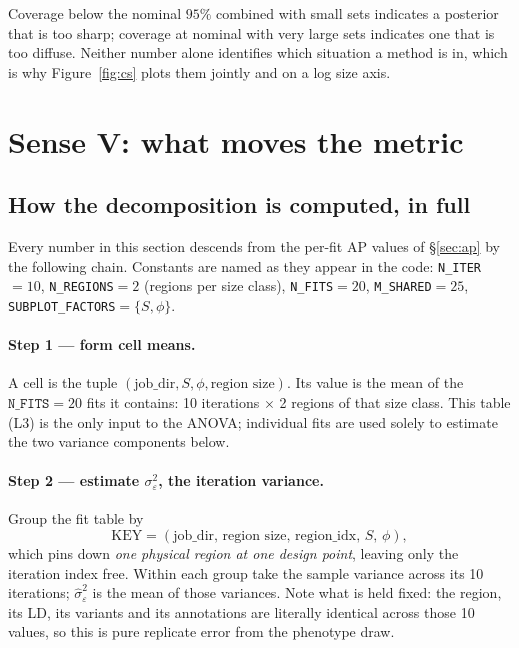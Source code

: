 \documentclass[11pt,a4paper]{article}
\begin{document}
Coverage below the nominal $95\%$ combined with small sets indicates a posterior
that is too sharp; coverage at nominal with very large sets indicates one that
is too diffuse. Neither number alone identifies which situation a method is in,
which is why Figure~\ref{fig:cs} plots them jointly and on a log size axis.

\section{Sense V: what moves the metric}\label{sec:sensev}

\subsection{How the decomposition is computed, in full}\label{sec:vhow}

Every number in this section descends from the per-fit AP values of
\S\ref{sec:ap} by the following chain. Constants are named as they appear in the
code: \texttt{N\_ITER}$=10$, \texttt{N\_REGIONS}$=2$ (regions per size class),
\texttt{N\_FITS}$=20$, \texttt{M\_SHARED}$=25$, \texttt{SUBPLOT\_FACTORS}$=\{S,\phi\}$.

\paragraph{Step 1 --- form cell means.}
A cell is the tuple $(\text{job\_dir},S,\phi,\text{region size})$. Its value is
the mean of the $\texttt{N\_FITS}=20$ fits it contains: 10 iterations $\times$ 2
regions of that size class. This table (L3) is the only input to the ANOVA;
individual fits are used solely to estimate the two variance components below.

\paragraph{Step 2 --- estimate $\sigma^2_\varepsilon$, the iteration variance.}
Group the fit table by
\[
\mathrm{KEY}=(\text{job\_dir},\,\text{region size},\,\text{region\_idx},\,S,\,\phi),
\]
which pins down \emph{one physical region at one design point}, leaving only the
iteration index free. Within each group take the sample variance across its 10
iterations; $\hat\sigma^2_\varepsilon$ is the mean of those variances. Note what
is held fixed: the region, its LD, its variants and its annotations are
literally identical across those 10 values, so this is pure replicate error from
the phenotype draw.
\end{document}
